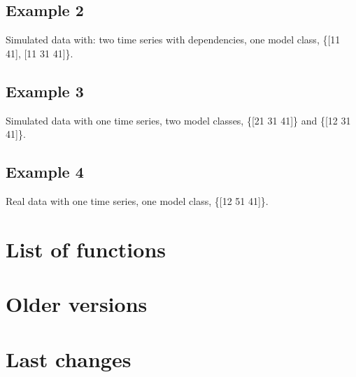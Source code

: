 \documentclass{article}
\begin{document}
\subsection{Example 2}
Simulated data with: two time series with dependencies, one model class, \{[11 41], [11 31 41]\}.

\subsection{Example 3}
Simulated data with one time series, two model classes, \{[21 31 41]\} and \{[12 31 41]\}.

\subsection{Example 4}
Real data with one time series, one model class, \{[12 51 41]\}.

\newpage

\section{List of functions}
\newpage


\section{Older versions}
\newpage

\section{Last changes}


\newpage
\end{document}
